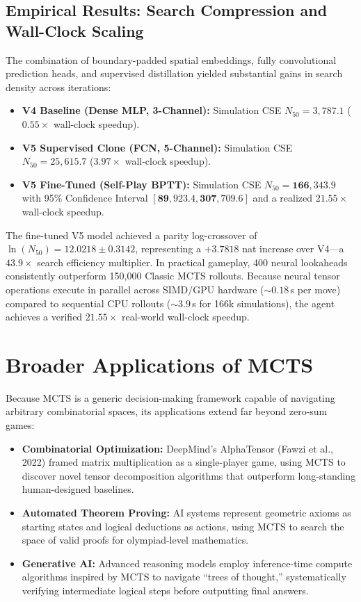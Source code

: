 \documentclass[12pt,a4paper]{article}
\begin{document}
\subsection{Empirical Results: Search Compression and Wall-Clock Scaling}
The combination of boundary-padded spatial embeddings, fully convolutional prediction heads, and supervised distillation yielded substantial gains in search density across iterations:
\begin{itemize}
    \item \textbf{V4 Baseline (Dense MLP, 3-Channel):} Simulation CSE $N_{50} = 3,787.1$ ($0.55\times$ wall-clock speedup).
    \item \textbf{V5 Supervised Clone (FCN, 5-Channel):} Simulation CSE $N_{50} = 25,615.7$ ($3.97\times$ wall-clock speedup).
    \item \textbf{V5 Fine-Tuned (Self-Play BPTT):} Simulation CSE $N_{50} = \mathbf{166,343.9}$ with 95\% Confidence Interval $[\mathbf{89,923.4}, \mathbf{307,709.6}]$ and a realized $\mathbf{21.55\times}$ wall-clock speedup.
\end{itemize}
The fine-tuned V5 model achieved a parity log-crossover of $\ln(N_{50}) = 12.0218 \pm 0.3142$, representing a $+3.7818$ nat increase over V4---a $\mathbf{43.9\times}$ search efficiency multiplier. In practical gameplay, 400 neural lookaheads consistently outperform 150,000 Classic MCTS rollouts. Because neural tensor operations execute in parallel across SIMD/GPU hardware ($\sim 0.18$\,s per move) compared to sequential CPU rollouts ($\sim 3.9$\,s for 166k simulations), the agent achieves a verified $21.55\times$ real-world wall-clock speedup.

\section{Broader Applications of MCTS}
Because MCTS is a generic decision-making framework capable of navigating arbitrary combinatorial spaces, its applications extend far beyond zero-sum games:
\begin{itemize}
    \item \textbf{Combinatorial Optimization:} DeepMind's AlphaTensor (Fawzi et al., 2022) framed matrix multiplication as a single-player game, using MCTS to discover novel tensor decomposition algorithms that outperform long-standing human-designed baselines.
    \item \textbf{Automated Theorem Proving:} AI systems represent geometric axioms as starting states and logical deductions as actions, using MCTS to search the space of valid proofs for olympiad-level mathematics.
    \item \textbf{Generative AI:} Advanced reasoning models employ inference-time compute algorithms inspired by MCTS to navigate ``trees of thought,'' systematically verifying intermediate logical steps before outputting final answers.
\end{itemize}
\end{document}
